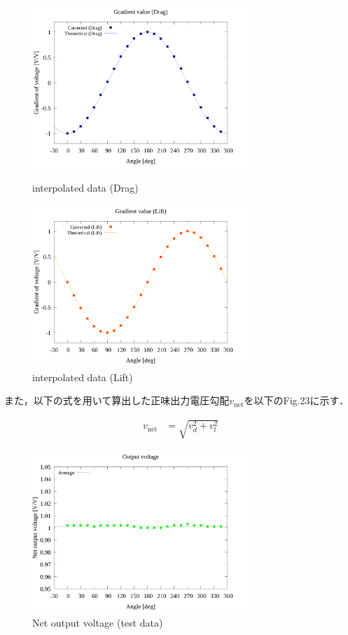 \documentclass[twocolumn,a4j]{jsarticle}
\begin{document}
\begin{figure}[htbp]
    \footnotesize
    \begin{center}
        \includegraphics[width=82mm]{../../../02_workspace/result/simulation_tx=10.0_ty=-5.0_dx=5.00_dy=-2.50/plot/21/21-4_corrected_angle_drag.png}
        \caption{interpolated data (Drag)}
        \includegraphics[width=82mm]{../../../02_workspace/result/simulation_tx=10.0_ty=-5.0_dx=5.00_dy=-2.50/plot/21/21-4_corrected_angle_lift.png}
        \caption{interpolated data (Lift)}
    \end{center}
\end{figure}

また，以下の式を用いて算出した正味出力電圧勾配$v_{\mathrm{net}}$を以下のFig.23に示す．

\begin{align*}
    v_{\mathrm{net}} & = \sqrt{v_d^2 + v_l^2}
\end{align*}

\begin{figure}[htbp]
    \footnotesize
    \begin{center}
        \includegraphics[width=82mm]{../../../02_workspace/result/simulation_tx=10.0_ty=-5.0_dx=5.00_dy=-2.50/plot/09/09_summary-outputvoltage-net.png}
        \caption{Net output voltage (test data)}
    \end{center}
\end{figure}
\end{document}
